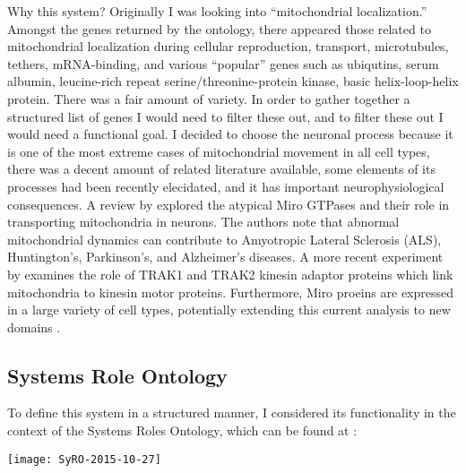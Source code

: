 Why this system? Originally I was looking into ``mitochondrial localization.''
Amongst the genes returned by the ontology, there appeared those related to
mitochondrial localization during cellular reproduction, transport,
microtubules, tethers, mRNA-binding, and various ``popular'' genes such as
ubiqutins, serum  albumin, leucine-rich repeat serine/threonine-protein kinase,
basic helix-loop-helix protein. There was a fair amount of variety. In order to
gather together a structured list of genes I would need to filter these out, and
to filter these out I would need a functional goal. I decided to choose the
neuronal process because it is one of the most extreme cases of mitochondrial
movement in all cell types, there was a decent amount of related literature
available, some elements of its processes had been recently elecidated, and it
has important neurophysiological consequences. A review by \cite{Reis2009}
explored the atypical Miro GTPases and their role in transporting mitochondria
in neurons. The authors note that abnormal mitochondrial dynamics can contribute
to Amyotropic Lateral Sclerosis (ALS), Huntington's, Parkinson's, and
Alzheimer's diseases. A more recent experiment by \cite{Loss2015} examines the
role of TRAK1 and TRAK2 kinesin adaptor proteins which link mitochondria to
kinesin motor proteins. Furthermore, Miro proeins are expressed in a large
variety of cell types, potentially extending this current analysis to new
domains \citep{Reis2009}.

\subsection{Systems Role Ontology}

To define this system in a structured manner, I considered its functionality
in the context of the Systems Roles Ontology, which can be found at \SyRO:

\begin{center}
  \texttt{[image: SyRO-2015-10-27]}
\end{center}

